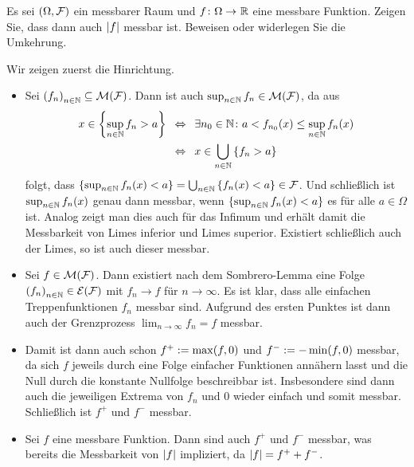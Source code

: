 \begin{exercisePage}
\pagebreak
    
    
    \begin{exercise}
        Es sei $(\Omega , \mathcal{F})$ ein messbarer Raum und $\abb{f}{\Omega}{\R}$ eine messbare Funktion. Zeigen Sie, dass dann auch $\left| f \right|$ messbar ist. Beweisen oder widerlegen Sie die Umkehrung.
    \end{exercise}

    Wir zeigen zuerst die Hinrichtung. 
    \begin{itemize}[leftmargin=*]
        \item Sei $\folge{f_n} \subseteq \mathcal{M}(\ereignisF)$. Dann ist auch $\sup_{n \in \mathbb{N}} f_n \in \mathcal{M}(\mathcal{F})$, da aus
        \begin{equation*}
            \begin{aligned}
                x \in \left\{ \sup_{n \in \mathbb{N}} f_n > a \right\} 
                &\enskip \Leftrightarrow \enskip \exists n_0 \in \mathbb{N} \colon a < f_{n_0}(x) \leq \sup_{n \in \mathbb{N}} f_n(x) \\
                &\enskip \Leftrightarrow \enskip x \in \bigcup_{n \in \mathbb{N}} \left\{ f_n > a \right\}
            \end{aligned}
        \end{equation*}
        folgt, dass $\left\{ \sup_{n \in \mathbb{N}} f_n(x) < a \right\} = \bigcup_{n \in \mathbb{N}} \left\{ f_n(x) < a \right\} \in \mathcal{F}$. Und schließlich ist $\sup_{n \in \mathbb{N}} f_n(x)$ genau dann messbar, wenn $\left\{ \sup_{n \in \mathbb{N}} f_n(x) < a \right\}$ es für alle $a \in \Omega$ ist. Analog zeigt man dies auch für das Infimum und erhält damit die Messbarkeit von Limes inferior und Limes superior. Existiert schließlich auch der Limes, so ist auch dieser messbar.
        \item Sei $f \in \mathcal{M}(\mathcal{F})$. Dann existiert nach dem Sombrero-Lemma eine Folge $\folge{f_n} \in \mathcal{E}(\ereignisF)$ mit $f_n \longrightarrow f$ für $n \to \infty$. Es ist klar, dass alle einfachen Treppenfunktionen $f_n$ messbar sind. Aufgrund des ersten Punktes ist dann auch der Grenzprozess $\lim_{n \to \infty} f_n = f$ messbar.
        \item Damit ist dann auch schon $f^+ \mathrel{:=} \max(f , 0)$ und $f^- \mathrel{:=} - \min(f, 0)$ messbar, da sich $f$ jeweils durch eine Folge einfacher Funktionen annähern lasst und die Null durch die konstante Nullfolge beschreibbar ist. Insbesondere sind dann auch die jeweiligen Extrema von $f_n$ und $0$ wieder einfach und somit messbar. Schließlich ist $f^+$ und $f^-$ messbar.
        \item Sei $f$ eine messbare Funktion. Dann sind auch $f^+$ und $f^-$ messbar, was bereits die Messbarkeit von $\left| f \right|$ impliziert, da $\left| f \right| = f^+ + f^-$.
    \end{itemize}


\end{exercisePage}
